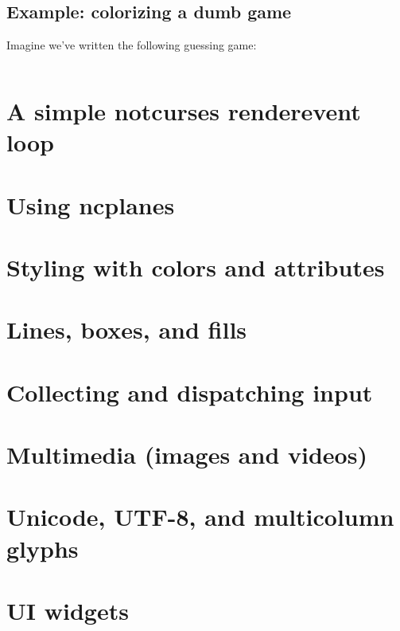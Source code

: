 \documentclass[letterpaper,10pt]{article}
\begin{document}
\subsection{Example: colorizing a dumb game}

Imagine we've written the following guessing game:

\begin{listing}[ht]
\inputminted{C}{code/hilostdio.c}
\end{listing}
\newpage

\section{A simple notcurses render\/event loop}
\newpage

\section{Using ncplanes}
\newpage

\section{Styling with colors and attributes}
\newpage

\section{Lines, boxes, and fills}
\newpage

\section{Collecting and dispatching input}
\newpage

\section{Multimedia (images and videos)}
\newpage

\section{Unicode, UTF-8, and multicolumn glyphs}
\newpage

\section{UI widgets}
\newpage
\end{document}
